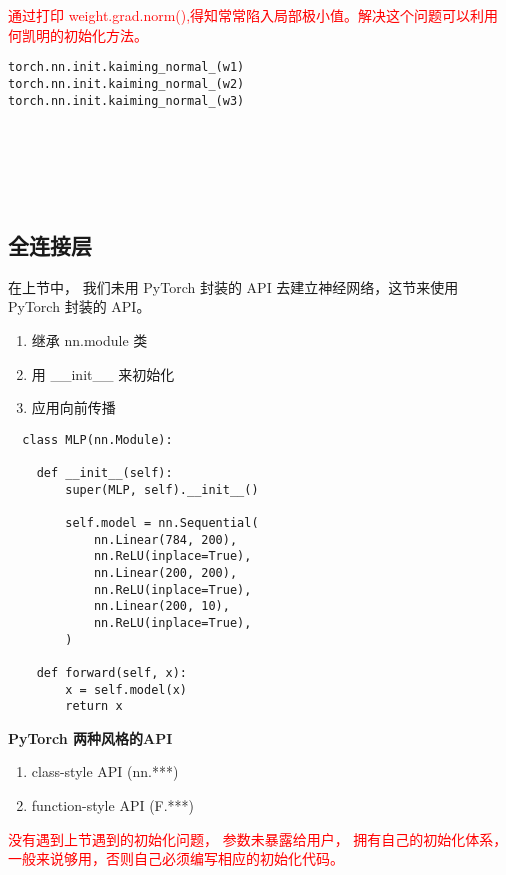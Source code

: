 \textcolor{red}{通过打印 weight.grad.norm(),得知常常陷入局部极小值。解决这个问题可以利用何凯明的初始化方法。}
\begin{lstlisting}
torch.nn.init.kaiming_normal_(w1)
torch.nn.init.kaiming_normal_(w2)
torch.nn.init.kaiming_normal_(w3)
\end{lstlisting}
~\\~\\~\\~\\



\subsection{全连接层}
在上节中， 我们未用 PyTorch 封装的 API 去建立神经网络，这节来使用 PyTorch 封装的 API。
\begin{enumerate}
  \item 继承 nn.module 类
  \item 用 \_\_init\_\_ 来初始化
  \item 应用向前传播
\end{enumerate}
  \begin{lstlisting}
  class MLP(nn.Module):

    def __init__(self):
        super(MLP, self).__init__()

        self.model = nn.Sequential(
            nn.Linear(784, 200),
            nn.ReLU(inplace=True),
            nn.Linear(200, 200),
            nn.ReLU(inplace=True),
            nn.Linear(200, 10),
            nn.ReLU(inplace=True),
        )

    def forward(self, x):
        x = self.model(x)
        return x
  \end{lstlisting}

\noindent\textbf{PyTorch 两种风格的API}
  \begin{enumerate}
    \item class-style API (nn.***)
    \item function-style API (F.***)
  \end{enumerate}

\textcolor{red}{{没有遇到上节遇到的初始化问题， 参数未暴露给用户， 拥有自己的初始化体系，一般来说够用，否则自己必须编写相应的初始化代码。}}


~\\~\\~\\~\\



